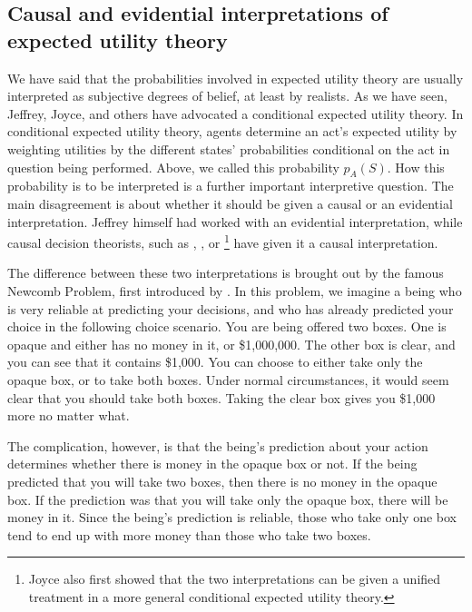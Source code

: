 \subsection{Causal and evidential interpretations of expected utility theory}\label{subs33}

We have said that the probabilities involved in expected utility theory are usually interpreted as subjective degrees of belief, at least by realists. As we have seen, Jeffrey, Joyce, and others have advocated a conditional expected utility theory. In conditional expected utility theory, agents determine an act's expected utility by weighting utilities by the different states' probabilities conditional on the act in question being performed. Above, we called this probability $p_{A} (S)$. How this probability is to be interpreted is a further important interpretive question. The main disagreement is about whether it should be given a causal or an evidential interpretation. Jeffrey himself had worked with an evidential interpretation, while causal decision theorists, such as \citet{GibbardHarper1978}, \citet{Armendt1986}, or \citet{Joyce1999}\footnote{Joyce also first showed that the two interpretations can be given a unified treatment in a more general conditional expected utility theory.} have given it a causal interpretation.

The difference between these two interpretations is brought out by the famous Newcomb Problem, first introduced by \citet{Nozick1969}. In this problem, we imagine a being who is very reliable at predicting your decisions, and who has already predicted your choice in the following choice scenario. You are being offered two boxes. One is opaque and either has no money in it, or \$1,000,000. The other box is clear, and you can see that it contains \$1,000. You can choose to either take only the opaque box, or to take both boxes. Under normal circumstances, it would seem clear that you should take both boxes. Taking the clear box gives you \$1,000 more no matter what.

The complication, however, is that the being's prediction about your action determines whether there is money in the opaque box or not. If the being predicted that you will take two boxes, then there is no money in the opaque box. If the prediction was that you will take only the opaque box, there will be money in it. Since the being's prediction is reliable, those who take only one box tend to end up with more money than those who take two boxes.

